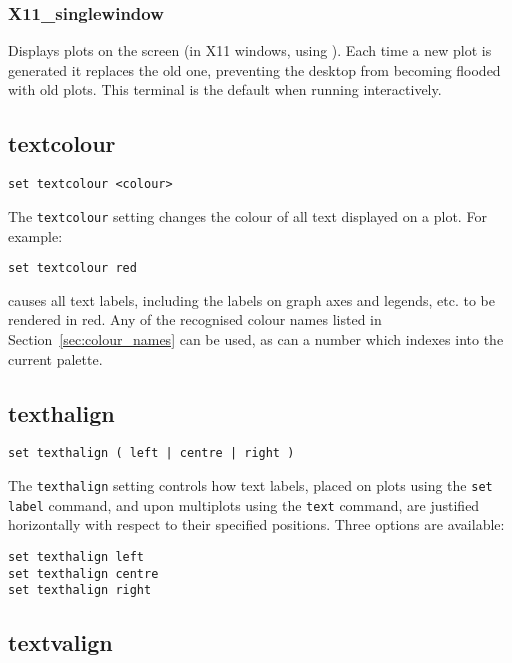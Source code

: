 \subsubsection{X11\_singlewindow}

Displays plots on the screen (in X11 windows, using \ghostview). Each time a new
plot is generated it replaces the old one, preventing the desktop from becoming
flooded with old plots. This terminal is the default when running
interactively.

\subsection{textcolour}

\begin{verbatim}
set textcolour <colour>
\end{verbatim}

The {\tt textcolour} setting changes the colour of all text displayed on a plot.
For example:

\begin{verbatim}
set textcolour red
\end{verbatim}

\noindent causes all text labels, including the labels on graph axes and
legends, etc. to be rendered in red. Any of the recognised colour names listed
in Section~\ref{sec:colour_names} can be used, as can a number which indexes
into the current palette.

\subsection{texthalign}

\begin{verbatim}
set texthalign ( left | centre | right )
\end{verbatim}

The {\tt texthalign} setting controls how text labels, placed on plots using the
{\tt set label} command, and upon multiplots using the {\tt text} command, are
justified horizontally with respect to their specified positions. Three options
are available:

\begin{verbatim}
set texthalign left
set texthalign centre
set texthalign right
\end{verbatim}

\subsection{textvalign}

